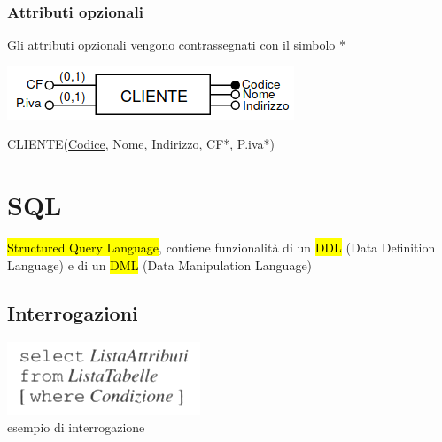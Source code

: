 \documentclass[a4paper]{article}
\begin{document}
\subsubsection{Attributi opzionali}
Gli attributi opzionali vengono contrassegnati con il simbolo *
\begin{center}
      \includegraphics[scale=0.5]{img/pl12.png}
\end{center}
%
CLIENTE(\underline{Codice}, Nome, Indirizzo, CF*, P.iva*)


\section{SQL}
\hl{Structured Query Language}, contiene funzionalità di un \hl{DDL} (Data Definition Language) e di un \hl{DML} (Data Manipulation Language)\medskip\\

\subsection{Interrogazioni}
\begin{center}
      \includegraphics[scale=0.5]{img/sql1.png}\\
      esempio di interrogazione
\end{center}
\end{document}
